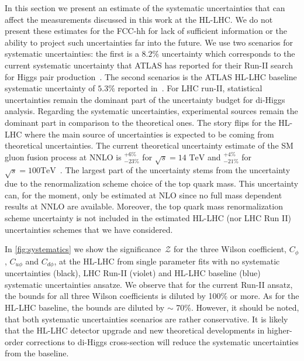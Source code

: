 In this section we present an estimate of the systematic uncertainties that can affect the measurements discussed in this work at the HL-LHC. We do not present these estimates for the FCC-hh for lack of sufficient information or the ability to project such uncertainties far into the future. We use two scenarios for systematic uncertainties: the first is a $8.2\%$ uncertainty which corresponds to the current systematic uncertainty that ATLAS has reported for their Run-II search for Higgs pair production~\cite{ATLAS-CONF-2021-016}. The second scenarios is the ATLAS HL-LHC baseline systematic uncertainty of $5.3\%$ reported in~\cite{ATL-PHYS-PUB-2018-053}. For LHC run-II, statistical uncertainties remain the dominant part of the uncertainty budget for di-Higgs analysis. Regarding the systematic uncertainties, experimental sources remain the dominant part in comparison to the theoretical ones.  The story flips for the HL-LHC where the main source of uncertainties is expected to be coming from theoretical uncertainties. The current theoretical uncertainty estimate of the SM gluon fusion process at NNLO is ${}^{+6\%}_{-23\%}$ for $\sqrt{s}=14\text{ TeV}$ and ${}^{+4\%}_{-21\%}$ for $\sqrt{s}=100\text{TeV}$~\cite{Baglio:2020wgt}. The largest part of the uncertainty stems from the uncertainty due to the renormalization scheme choice of the top quark mass. This uncertainty can, for the moment, only be estimated at NLO since no full mass dependent results at NNLO are available. Moreover, the top quark mass renormalization scheme uncertainty is not included in the estimated HL-LHC (nor LHC Run II) uncertainties schemes that we have considered. 

In \autoref{fig:systematics} we show the significance~$\mathcal{Z}$ for the three Wilson coefficient, $C_\phi$, $C_{u\phi}$ and $C_{d\phi}$, at the HL-LHC from single parameter fits with no systematic uncertainties (black), LHC Run-II (violet) and HL-LHC baseline (blue) systematic uncertainties ansatze. We observe that for the current Run-II ansatz, the bounds for all three Wilson coefficients is diluted by 100\% or more. As for the HL-LHC baseline, the bounds are diluted by $\sim$ 70\%. However, it should be noted, that both systematic uncertainties scenarios are rather conservative. It is likely that the HL-LHC detector upgrade and new theoretical developments in higher-order corrections to di-Higgs cross-section will reduce the systematic uncertainties from the baseline. 

